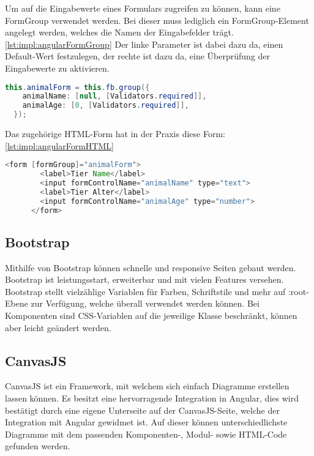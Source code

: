 Um auf die Eingabewerte eines Formulars zugreifen zu können, kann eine FormGroup verwendet werden. Bei dieser muss lediglich ein FormGroup-Element angelegt werden, welches die Namen der Eingabefelder trägt. \ref{lst:impl:angularFormGroup} Der linke Parameter ist dabei dazu da, einen Default-Wert festzulegen, der rechte ist dazu da, eine Überprüfung der Eingabewerte zu aktivieren.
 
\begin{lstlisting}[language=java,caption=Beispiel für FormGroup eines Angular Formulars,label=lst:impl:angularFormGroup]
  this.animalForm = this.fb.group({
    animalName: [null, [Validators.required]],
    animalAge: [0, [Validators.required]],
  });
\end{lstlisting}
 
Das zugehörige HTML-Form hat in der Praxis diese Form:  \ref{lst:impl:angularFormHTML}
 
 
\begin{lstlisting}[language=java,caption=Beispiel für ein reaktives Formular,label=lst:impl:angularFormHTML]
  <form [formGroup]="animalForm">
        <label>Tier Name</label>
        <input formControlName="animalName" type="text">
        <label>Tier Alter</label>
        <input formControlName="animalAge" type="number">
      </form>
\end{lstlisting}
\cite{angularHandbuchBuch}
 
 
\subsection{Bootstrap}
Mithilfe von Bootstrap können schnelle und responsive Seiten gebaut werden. Bootstrap ist leistungsstart, erweiterbar und mit vielen Features versehen. Bootstrap stellt vielzählige Variablen für Farben, Schriftstile und mehr auf :root-Ebene zur Verfügung, welche überall verwendet werden können. Bei Komponenten sind CSS-Variablen auf die jeweilige Klasse beschränkt, können aber leicht geändert werden. 
\cite{bootstrap}

\subsection{CanvasJS}
 
CanvasJS ist ein Framework, mit welchem sich einfach Diagramme erstellen lassen können. Es besitzt eine hervorragende Integration in Angular, dies wird bestätigt durch eine eigene Unterseite auf der CanvasJS-Seite, welche der Integration mit Angular gewidmet ist. Auf dieser können unterschiedlichste Diagramme mit dem passenden Komponenten-, Modul- sowie HTML-Code gefunden werden.
 
